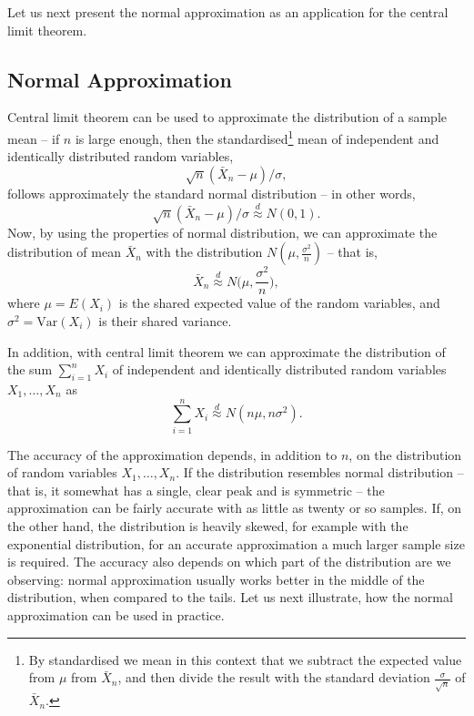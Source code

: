 \documentclass[12pt,a4paper,leqno]{report}
\newcommand{\var}{\mathrm{Var}}
\theoremstyle{plain}
\theoremstyle{definition}
\begin{document}
Let us next present the normal approximation as an application for the central limit theorem.

\subsection{Normal Approximation}

 Central limit theorem can be used to approximate the distribution of a sample mean -- if $n$ is large enough, then the standardised\footnote{By standardised we mean in this context that we subtract the expected value from $\mu$ from $\bar{X}_n$, and then divide the result with the standard deviation $\frac{\sigma}{\sqrt{n}}$ of $\bar{X}_n$.} mean of independent and identically distributed random variables,  
\[
\sqrt{n}(\bar{X}_n - \mu) /\sigma,
\]
follows approximately the standard normal distribution -- in other words, 
\[
\sqrt{n}(\bar{X}_n - \mu) /\sigma \overset{d}{\approx} N(0,1).
\]
Now, by using the properties of normal distribution, we can approximate the distribution of mean $\bar{X}_n$ with the distribution $N(\mu, \frac{\sigma^2}{n})$ -- that is,
\[
\bar{X}_n \overset{d}{\approx} N\Big(\mu,\frac{\sigma^2}{n}\Big),
\]
where $\mu = E(X_i)$ is the shared expected value of the random variables, and $\sigma^2 = \var(X_i)$ is their shared variance.  

In addition, with central limit theorem we can approximate the distribution of the sum $\sum_{i=1}^n X_i$ of independent and identically distributed random variables $X_1, \dots , X_n$ as
\[ 
\sum_{i=1}^n X_i \overset{d}{\approx} N(n\mu, n\sigma^2).
\]

The accuracy of the approximation depends, in addition to $n$, on the distribution of random variables $X_1, \dots , X_n$. If the distribution resembles normal distribution -- that is, it somewhat has a single, clear peak and is symmetric -- the approximation can be fairly accurate with as little as twenty or so samples. If, on the other hand, the distribution is heavily skewed, for example with the exponential distribution, for an accurate approximation a much larger sample size is required. The accuracy also depends on which part of the distribution are we observing: normal approximation usually works better in the middle of the distribution, when compared to the tails. Let us next illustrate, how the normal approximation can be used in practice.
\end{document}
